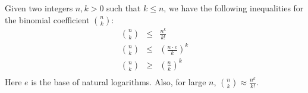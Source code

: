 \documentclass[12pt]{article}
\begin{document}
Given two integers $n,k>0$ such that $k\le n$, we have the following inequalities for the binomial coefficient ${n\choose k}$:
\begin{eqnarray*}
{n \choose k} & \le & \frac{n^k}{k!} \\
{n \choose k} & \le & \left(\frac{n\cdot e}{k}\right)^k \\
{n \choose k} & \ge & \left(\frac{n}{k}\right)^k \\
\end{eqnarray*}
Here $e$ is the base of natural logarithms.
Also, for large $n$, ${n \choose k} \approx \frac{n^k}{k!}$.
\end{document}
